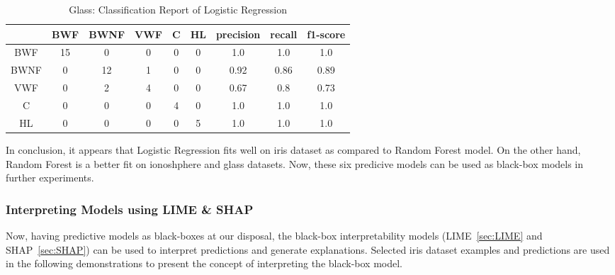 \documentclass[english]{tktltiki2}
\theoremstyle{definition}
\theoremstyle{remark}
\begin{document}
\begin{table}[H]
	\begin{center}
		\caption{Glass: Classification Report of Logistic Regression}
		\label{table:lr_model_glass_report}
		\begin{tabular}{@{}ccccccccc@{}}
			\toprule
			& BWF & BWNF & VWF & C & HL & precision & recall & f1-score \\ \hline
			\multicolumn{1}{|c|}{BWF} & \multicolumn{1}{c|}{15} & \multicolumn{1}{c|}{0} & \multicolumn{1}{c|}{0} & \multicolumn{1}{c|}{0} & \multicolumn{1}{c|}{0} & \multicolumn{1}{c|}{1.0} & \multicolumn{1}{c|}{1.0} & \multicolumn{1}{c|}{1.0} \\ \hline
			
			\multicolumn{1}{|c|}{BWNF} & \multicolumn{1}{c|}{0} & \multicolumn{1}{c|}{12} & \multicolumn{1}{c|}{1} & \multicolumn{1}{c|}{0} & \multicolumn{1}{c|}{0} & \multicolumn{1}{c|}{0.92} & \multicolumn{1}{c|}{0.86} & \multicolumn{1}{c|}{0.89} \\ \hline
			
			\multicolumn{1}{|c|}{VWF} & \multicolumn{1}{c|}{0} & \multicolumn{1}{c|}{2} & \multicolumn{1}{c|}{4} & \multicolumn{1}{c|}{0} & \multicolumn{1}{c|}{0} & \multicolumn{1}{c|}{0.67} & \multicolumn{1}{c|}{0.8} & \multicolumn{1}{c|}{0.73} \\ \hline
			
			\multicolumn{1}{|c|}{C} & \multicolumn{1}{c|}{0} & \multicolumn{1}{c|}{0} & \multicolumn{1}{c|}{0} & \multicolumn{1}{c|}{4} & \multicolumn{1}{c|}{0} & \multicolumn{1}{c|}{1.0} & \multicolumn{1}{c|}{1.0} & \multicolumn{1}{c|}{1.0} \\ \hline
			
			\multicolumn{1}{|c|}{HL} & \multicolumn{1}{c|}{0} & \multicolumn{1}{c|}{0} & \multicolumn{1}{c|}{0} & \multicolumn{1}{c|}{0} & \multicolumn{1}{c|}{5} & \multicolumn{1}{c|}{1.0} & \multicolumn{1}{c|}{1.0} & \multicolumn{1}{c|}{1.0} \\ \hline
		\end{tabular}
	\end{center}
\end{table}

In conclusion, it appears that Logistic Regression fits well on iris dataset as compared to Random Forest model. On the other hand, Random Forest is a better fit on ionoshphere and glass datasets. Now, these six predicive models can be used as black-box models in further experiments.

\subsubsection{Interpreting Models using LIME \& SHAP}
Now, having predictive models as black-boxes at our disposal, the black-box interpretability models (LIME~\ref{sec:LIME} and SHAP~\ref{sec:SHAP}) can be used to interpret predictions and generate explanations. Selected iris dataset examples and predictions are used in the following demonstrations to present the concept of interpreting the black-box model.
\end{document}

